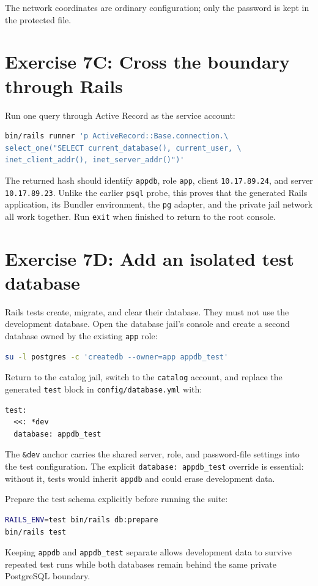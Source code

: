 The network coordinates are ordinary configuration; only the password is kept
in the protected file.

\section{Exercise 7C: Cross the boundary through Rails}

Run one query through Active Record as the service account:

\begin{lstlisting}[language=sh]
bin/rails runner 'p ActiveRecord::Base.connection.\
select_one("SELECT current_database(), current_user, \
inet_client_addr(), inet_server_addr()")'
\end{lstlisting}

The returned hash should identify \texttt{appdb}, role \texttt{app}, client
\texttt{10.17.89.24}, and server \texttt{10.17.89.23}. Unlike the earlier
\texttt{psql} probe, this proves that the generated Rails application, its
Bundler environment, the \texttt{pg} adapter, and the private jail network all
work together. Run \texttt{exit} when finished to return to the root console.

\section{Exercise 7D: Add an isolated test database}

Rails tests create, migrate, and clear their database. They must not use the
development database. Open the database jail's console and create a second
database owned by the existing \texttt{app} role:

\begin{lstlisting}[language=sh]
su -l postgres -c 'createdb --owner=app appdb_test'
\end{lstlisting}

Return to the catalog jail, switch to the \texttt{catalog} account, and replace
the generated \texttt{test} block in \texttt{config/database.yml} with:

\begin{lstlisting}
test:
  <<: *dev
  database: appdb_test
\end{lstlisting}

The \texttt{\&dev} anchor carries the shared server, role, and password-file
settings into the test configuration. The explicit \texttt{database:
appdb\_test} override is essential: without it, tests would inherit
\texttt{appdb} and could erase development data.

Prepare the test schema explicitly before running the suite:

\begin{lstlisting}[language=sh]
RAILS_ENV=test bin/rails db:prepare
bin/rails test
\end{lstlisting}

Keeping \texttt{appdb} and \texttt{appdb\_test} separate allows development
data to survive repeated test runs while both databases remain behind the same
private PostgreSQL boundary.
